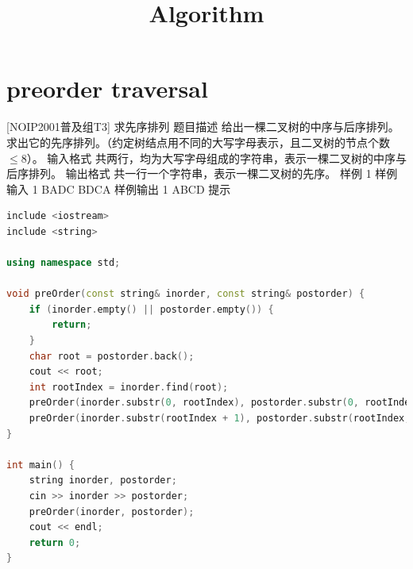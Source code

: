 \documentclass[12pt,twiside,a4paper]{ctexbook}
\numberwithin{chapter}{part}
\begin{document}
\title{Algorithm}
\maketitle
\tableofcontents %
\newpage
\pagestyle{fancy}


\section{preorder traversal}
[NOIP2001普及组T3] 求先序排列
 题目描述
给出一棵二叉树的中序与后序排列。求出它的先序排列。（约定树结点用不同的大写字母表示，且二叉树的节点个数 $ \le 8$）。
 输入格式
共两行，均为大写字母组成的字符串，表示一棵二叉树的中序与后序排列。
 输出格式
共一行一个字符串，表示一棵二叉树的先序。
 样例 1
 样例输入 1
BADC
BDCA
样例输出 1
ABCD
 提示
\begin{lstlisting}[language=C++,breaklines=true]
include <iostream>
include <string>

using namespace std;

void preOrder(const string& inorder, const string& postorder) {
    if (inorder.empty() || postorder.empty()) {
        return;
    }
    char root = postorder.back();
    cout << root;
    int rootIndex = inorder.find(root);
    preOrder(inorder.substr(0, rootIndex), postorder.substr(0, rootIndex));
    preOrder(inorder.substr(rootIndex + 1), postorder.substr(rootIndex, postorder.length() - rootIndex - 1));
}

int main() {
    string inorder, postorder;
    cin >> inorder >> postorder;
    preOrder(inorder, postorder);
    cout << endl;
    return 0;
}
\end{lstlisting}
\end{document}
